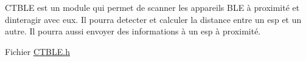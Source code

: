 CTBLE est un module qui permet de scanner les appareils BLE à proximité et d\textquotesingle{}interagir avec eux. Il pourra detecter et calculer la distance entre un esp et un autre. Il pourra aussi envoyer des informations à un esp à proximité.

Fichier \mbox{\hyperlink{_c_t_b_l_e_8h}{CTBLE.\+h}} 